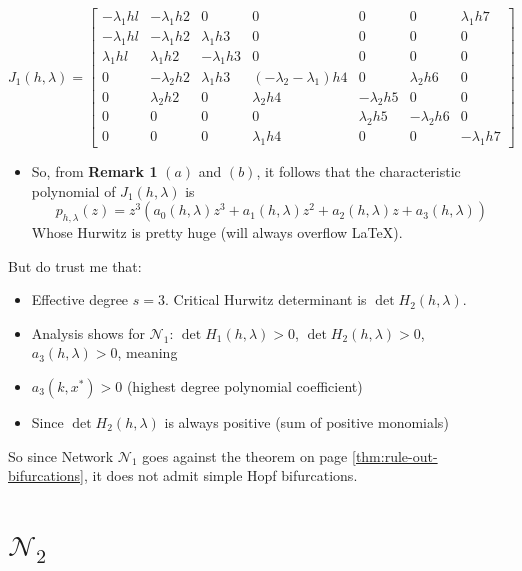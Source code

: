 \documentclass[aspectratio=169]{beamer}
\begin{document}
\begin{frame}
\[
	\left. J_1(h, \lambda) =\left[
		\begin{array}{ccccccc}-\lambda_1hl&-\lambda_1h2&0&0&0&0&\lambda_1h7\\-\lambda_1hl&-\lambda_1h2&\lambda_1h3&0&0&0&0\\\lambda_1hl&\lambda_1h2&-\lambda_1h3&0&0&0&0\\0&-\lambda_2h2&\lambda_1h3&(-\lambda_2-\lambda_1)h4&0&\lambda_2h6&0\\0&\lambda_2h2&0&\lambda_2h4&-\lambda_2h5&0&0\\0&0&0&0&\lambda_2h5&-\lambda_2h6&0\\0&0&0&\lambda_1h4&0&0&-\lambda_1h7
	\end{array}\right.\right]
\]
\end{frame}

\begin{frame}
\begin{itemize}
	\item So, from \textbf{Remark 1} $(a)$ and $(b)$, it follows that the characteristic polynomial of $J_1(h, \lambda)$ is
		\[
			p_{h,\lambda}(z) = z^3 (a_0(h,\lambda) z^3 + a_1(h,\lambda) z^2 + a_2(h,\lambda) z + a_3(h,\lambda))
		\]
		Whose Hurwitz is pretty huge (will always overflow \LaTeX).
\end{itemize}
But do trust me that:
\begin{theorem}
	\begin{itemize}
		\item Effective degree $s=3$. Critical Hurwitz determinant is $\det H_2(h,\lambda)$.
		\item Analysis shows for $\mathcal{N}_1$:
			$\det H_1(h, \lambda) > 0$, $\det H_2(h, \lambda) > 0$, $a_3(h, \lambda) > 0$, meaning
		\item $a_3(k, x^*) > 0$ (highest degree polynomial coefficient)
		\item Since $\det H_2(h, \lambda)$ is always positive (sum of positive monomials)
	\end{itemize}
	So since Network $\mathcal{N}_1$ goes against the theorem on page  \ref{thm:rule-out-bifurcations}, it does not admit simple Hopf bifurcations.
\end{theorem}
\end{frame}

\section{$\mathcal{N}_2$}
\end{document}
